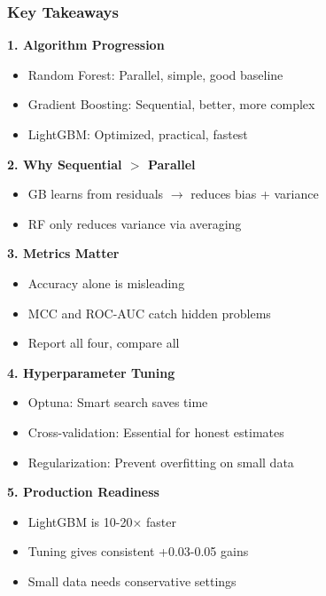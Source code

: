 \documentclass{beamer}
\begin{document}
\begin{frame}[fragile]
\frametitle{Key Takeaways}

\textbf{1. Algorithm Progression}
\begin{itemize}
    \item Random Forest: Parallel, simple, good baseline
    \item Gradient Boosting: Sequential, better, more complex
    \item LightGBM: Optimized, practical, fastest
\end{itemize}

\textbf{2. Why Sequential $>$ Parallel}
\begin{itemize}
    \item GB learns from residuals $\rightarrow$ reduces bias + variance
    \item RF only reduces variance via averaging
\end{itemize}

\textbf{3. Metrics Matter}
\begin{itemize}
    \item Accuracy alone is misleading
    \item MCC and ROC-AUC catch hidden problems
    \item Report all four, compare all
\end{itemize}

\textbf{4. Hyperparameter Tuning}
\begin{itemize}
    \item Optuna: Smart search saves time
    \item Cross-validation: Essential for honest estimates
    \item Regularization: Prevent overfitting on small data
\end{itemize}

\textbf{5. Production Readiness}
\begin{itemize}
    \item LightGBM is 10-20× faster
    \item Tuning gives consistent +0.03-0.05 gains
    \item Small data needs conservative settings
\end{itemize}

\end{frame}
\end{document}
